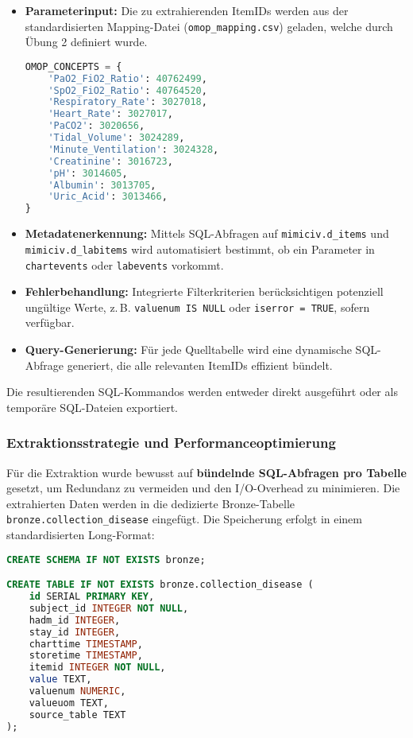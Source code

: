 \documentclass[12pt]{article}
\begin{document}
\begin{itemize}
  \item \textbf{Parameterinput:} Die zu extrahierenden ItemIDs werden aus der standardisierten Mapping-Datei (\texttt{omop\_mapping.csv}) geladen, welche durch Übung 2 definiert wurde.
  \begin{lstlisting}[language=Python]
OMOP_CONCEPTS = {
    'PaO2_FiO2_Ratio': 40762499,
    'SpO2_FiO2_Ratio': 40764520,
    'Respiratory_Rate': 3027018,
    'Heart_Rate': 3027017,
    'PaCO2': 3020656,
    'Tidal_Volume': 3024289,
    'Minute_Ventilation': 3024328,
    'Creatinine': 3016723,
    'pH': 3014605,
    'Albumin': 3013705,
    'Uric_Acid': 3013466,
}
\end{lstlisting}
  \item \textbf{Metadatenerkennung:} Mittels SQL-Abfragen auf \texttt{mimiciv.d\_items} und \texttt{mimiciv.d\_labitems} wird automatisiert bestimmt, ob ein Parameter in \texttt{chartevents} oder \texttt{labevents} vorkommt.
  \item \textbf{Fehlerbehandlung:} Integrierte Filterkriterien berücksichtigen potenziell ungültige Werte, z.\,B. \texttt{valuenum IS NULL} oder \texttt{iserror = TRUE}, sofern verfügbar.
  \item \textbf{Query-Generierung:} Für jede Quelltabelle wird eine dynamische SQL-Abfrage generiert, die alle relevanten ItemIDs effizient bündelt.
\end{itemize}

Die resultierenden SQL-Kommandos werden entweder direkt ausgeführt oder als temporäre SQL-Dateien exportiert.

\subsubsection{Extraktionsstrategie und Performanceoptimierung}

Für die Extraktion wurde bewusst auf \textbf{bündelnde SQL-Abfragen pro Tabelle} gesetzt, um Redundanz zu vermeiden und den I/O-Overhead zu minimieren. Die extrahierten Daten werden in die dedizierte Bronze-Tabelle \texttt{bronze.collection\_disease} eingefügt. Die Speicherung erfolgt in einem standardisierten Long-Format:

\begin{lstlisting}[language=SQL, caption={Erstellung der Bronze-Tabelle}]
CREATE SCHEMA IF NOT EXISTS bronze;

CREATE TABLE IF NOT EXISTS bronze.collection_disease (
    id SERIAL PRIMARY KEY,
    subject_id INTEGER NOT NULL,
    hadm_id INTEGER,
    stay_id INTEGER,
    charttime TIMESTAMP,
    storetime TIMESTAMP,
    itemid INTEGER NOT NULL,
    value TEXT,
    valuenum NUMERIC,
    valueuom TEXT,
    source_table TEXT
);
\end{lstlisting}
\end{document}
